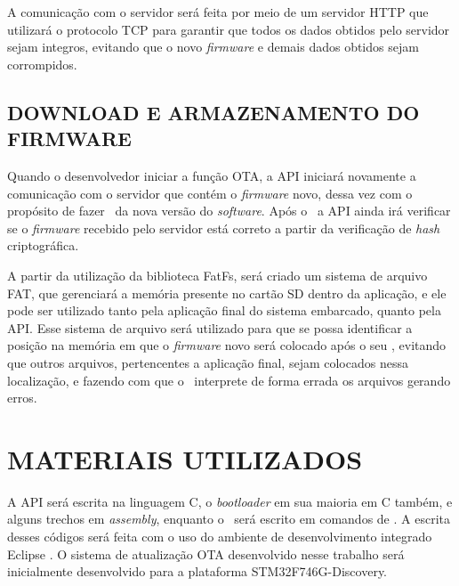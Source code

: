 A comunicação com o servidor será feita por meio de um servidor HTTP que utilizará o protocolo TCP para garantir que todos os dados obtidos pelo servidor sejam integros, evitando que o novo \textit{firmware} e demais dados obtidos sejam corrompidos. 


\subsection{DOWNLOAD E ARMAZENAMENTO DO FIRMWARE}

Quando o desenvolvedor iniciar a função OTA, a API iniciará novamente a comunicação com o servidor que contém o \textit{firmware} novo, dessa vez com o propósito de fazer \download\ da nova versão do \textit{software}. Após o \download\ a API ainda irá verificar se o \textit{firmware} recebido pelo servidor está correto a partir da verificação de \textit{hash} criptográfica. 

A partir da utilização da biblioteca FatFs, será criado um sistema de arquivo FAT, que gerenciará a memória presente no cartão SD dentro da aplicação, e ele pode ser utilizado tanto pela aplicação final do sistema embarcado, quanto pela API. Esse sistema de arquivo será utilizado para que se possa identificar a posição na memória em que o \textit{firmware} novo será colocado após o seu \download, evitando que outros arquivos, pertencentes a aplicação final, sejam colocados nessa localização, e fazendo com que o \bootloader\ interprete de forma errada os arquivos gerando erros.



\section{MATERIAIS UTILIZADOS}

A API será escrita na linguagem C, o \textit{bootloader} em sua maioria em C também, e alguns trechos em \textit{assembly}, enquanto o \linker\ será escrito em comandos de \linker. A escrita desses códigos será feita com o uso do ambiente de desenvolvimento integrado Eclipse \cite{Eclipse}. O sistema de atualização OTA desenvolvido nesse trabalho será inicialmente desenvolvido para a plataforma STM32F746G-Discovery.

